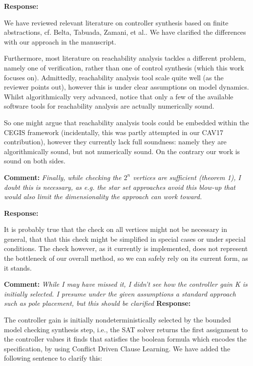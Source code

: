 \documentclass{article}
\begin{document}
\vspace{1em}
{\bf Response: }

We have reviewed relevant literature on controller synthesis based on finite abstractions, cf. Belta, Tabuada, Zamani, et al.. We have clarified the differences with our approach in the manuscript. 

Furthermore, most literature on reachability analysis tackles a different problem, namely one of verification, rather than one of control synthesis (which this work
focuses on). Admittedly, reachability analysis tool scale quite well (as the reviewer points out), however this is under clear assumptions on model dynamics. 
Whilst algorithmically very advanced, notice that only a few of the available software tools for reachability analysis are actually numerically sound. 

So one might argue that reachability analysis tools could be embedded within the CEGIS framework (incidentally, this was partly attempted in our CAV17 contribution), 
however they currently lack full soundness: namely they 
are algorithmically sound, but not numerically sound. On the contrary our work is sound on both sides. 


\vspace{2em}
{\bf Comment: }
{\itshape Finally, while checking the $2^n$ vertices
are sufficient (theorem 1), I doubt this is necessary, as e.g. the star set approaches avoid this blow-up that would also limit the dimensionality
the approach can work toward.}
\vspace{1em}

{\bf Response: }

It is probably true that the check on all vertices might not be necessary in general, that that this check might be simplified in special cases
or under special conditions. The check however, as it currently is implemented, does not represent the bottleneck of our overall method, so we can
safely rely on its current form, as it stands.  

\vspace{2em}

{\bf Comment: }
{\itshape While I may have missed it, I didn't see how the controller gain K is initially selected. I presume under the given assumptions a standard
approach
such as pole placement, but this should be clarified}
\vspace{1em}
{\bf Response: }

The controller gain is initially nondeterministically selected by the bounded model checking synthesis step, i.e., the SAT solver returns the first
assignment to the controller
values it finds
that satisfies the boolean formula which encodes the specification, by using Conflict Driven Clause Learning.
We have added the following sentence to clarify this:
\end{document}
